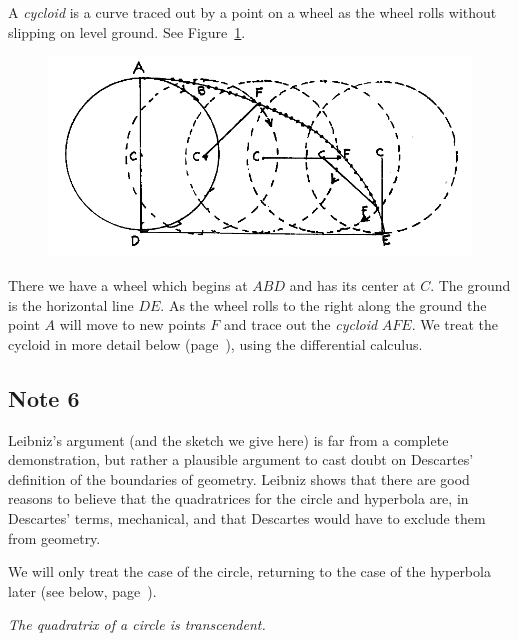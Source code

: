 \documentclass[twoside,openright]{article}
\begin{document}
A {\em cycloid} is a curve traced out by a point on a wheel as the
wheel rolls without slipping on level ground.  See
Figure~\ref{cycloidfig}.
\begin{figure}[htp]
\begin{center}
\includegraphics[width=\textwidth]{fig/Figure30}
\caption{}
\label{cycloidfig}
\vspace{-10pt}
\end{center}
\end{figure} There we have a wheel which begins at $ABD$ and has its
center at $C$.  The ground is the horizontal line $DE$.  As the wheel
rolls to the right along the ground the point $A$ will move to new
points $F$ and trace out the {\em cycloid} $AFE$.  We treat the
cycloid in more detail below (page~\pageref{cycloid}), using the
differential calculus.

\subsection*{Note 6}
\label{begtc}
\label{crg6}
Leibniz's argument (and the sketch we give here) is far from a
complete demonstration, but rather a plausible argument to cast doubt
on Descartes' definition of the boundaries of geometry. Leibniz shows
that there are good reasons to believe that the quadratrices for the
circle and hyperbola are, in Descartes' terms, mechanical, and that
Descartes would have to exclude them from geometry.

We will only treat the case of the circle, returning to the case of
the hyperbola later (see below, page~\pageref{begloghyp}).

\vspace{2ex}
 {\em The quadratrix of a circle is transcendent.}
\vspace{2ex}
\end{document}
